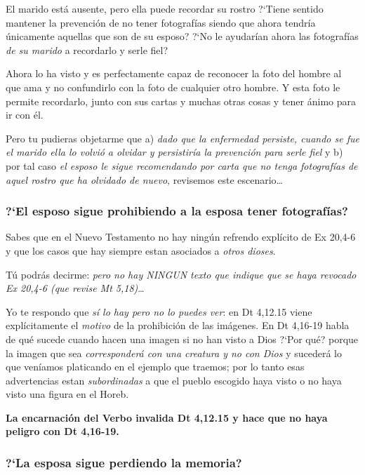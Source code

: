 \documentclass{article}
\begin{document}
\noindent
El marido est\'a ausente, pero ella puede recordar su rostro ?`Tiene sentido mantener la prevenci\'on de no tener fotograf\'{i}as siendo que ahora tendr\'{i}a \'unicamente aquellas que son de su esposo? ?`No le ayudar\'{i}an ahora las fotograf\'{i}as \emph{de su marido} a recordarlo y serle fiel?

Ahora lo ha visto y es perfectamente capaz de reconocer la foto del hombre al que ama y no confundirlo con la foto de cualquier otro hombre. Y esta foto le permite recordarlo, junto con sus cartas y muchas otras cosas y tener \'animo para ir con \'el.

Pero tu pudieras objetarme que a) \emph{dado que la enfermedad persiste, cuando se fue el marido ella lo volvi\'o a olvidar y persistir\'{i}a la prevenci\'on para serle fiel} y b) por tal caso \emph{el esposo le sigue recomendando por carta que no tenga fotograf\'{i}as de aquel rostro que ha olvidado de nuevo}, revisemos este escenario\ldots

\subsubsection{?`El esposo sigue prohibiendo a la esposa tener fotograf\'{i}as?}

Sabes que en el Nuevo Testamento no hay ning\'un refrendo expl\'{i}cito de Ex 20,4-6 y que los casos que hay siempre estan asociados a \emph{otros dioses}.

T\'u podr\'as decirme: \emph{pero no hay NINGUN texto que indique que se haya revocado Ex 20,4-6 (que revise Mt 5,18)}\ldots

Yo te respondo que \emph{s\'{i} lo hay pero no lo puedes ver}: en Dt 4,12.15 viene expl\'{i}citamente el \emph{motivo} de la prohibici\'on de las im\'agenes. En Dt 4,16-19 habla de qu\'e sucede cuando hacen una imagen si no han visto a Dios ?`Por qu\'e? porque la imagen que sea \emph{corresponder\'a con una creatura y no con Dios} y suceder\'a lo que ven\'{i}amos platicando en el ejemplo que traemos; por lo tanto esas advertencias estan \emph{subordinadas} a que el pueblo escogido haya visto o no haya visto una figura en el Horeb.

\textbf{La encarnaci\'on del Verbo invalida Dt 4,12.15 y hace que no haya peligro con Dt 4,16-19.}

\subsubsection{?`La esposa sigue perdiendo la memoria?}
\end{document}
